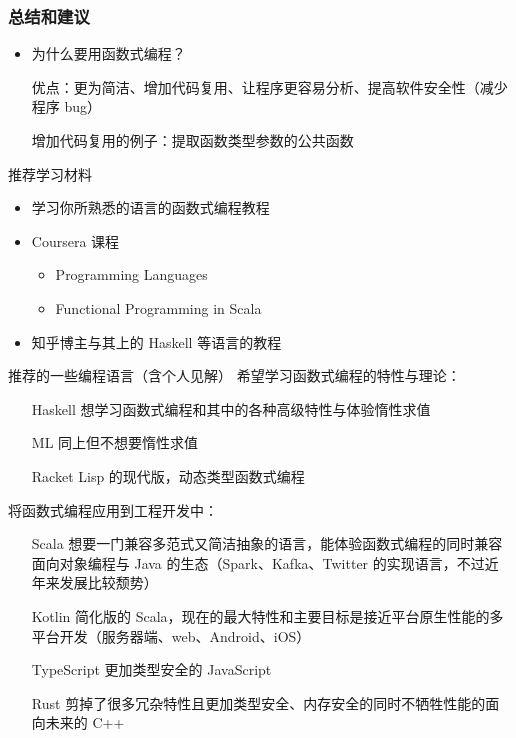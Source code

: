 \documentclass{beamer}
\begin{document}
\begin{frame}
    \frametitle{总结和建议}
    \begin{itemize}
        \item 为什么要用函数式编程？

              优点：更为简洁、增加代码复用、让程序更容易分析、提高软件安全性（减少程序 bug）

              增加代码复用的例子：提取函数类型参数的公共函数


    \end{itemize}
\end{frame}

\begin{frame}{推荐学习材料}
    \begin{itemize}
        \item 学习你所熟悉的语言的函数式编程教程
        \item Coursera 课程
              \begin{itemize}
                  \item Programming Languages
                  \item Functional Programming in Scala
              \end{itemize}
        \item 知乎博主与其上的 Haskell 等语言的教程
    \end{itemize}
\end{frame}

\begin{frame}{推荐的一些编程语言（含个人见解）}
    希望学习函数式编程的特性与理论：
    \begin{itemize}
        \item[Haskell] 想学习函数式编程和其中的各种高级特性与体验惰性求值
        \item[ML] 同上但不想要惰性求值
        \item[Racket] Lisp 的现代版，动态类型函数式编程
    \end{itemize}

    将函数式编程应用到工程开发中：
    \begin{itemize}
        \item[Scala] 想要一门兼容多范式又简洁抽象的语言，能体验函数式编程的同时兼容面向对象编程与 Java 的生态（Spark、Kafka、Twitter 的实现语言，不过近年来发展比较颓势）
        \item[Kotlin] 简化版的 Scala，现在的最大特性和主要目标是接近平台原生性能的多平台开发（服务器端、web、Android、iOS）
        \item[TypeScript] 更加类型安全的 JavaScript
        \item[Rust] 剪掉了很多冗杂特性且更加类型安全、内存安全的同时不牺牲性能的面向未来的 C++
    \end{itemize}
\end{frame}
\end{document}
